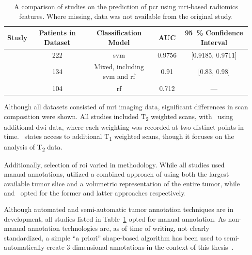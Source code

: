 \begin{table}[H]
    \centering
    \begin{tabular}{c c c c c}
        Study & Patients in Dataset & Classification Model & AUC & \SI{95}{\percent} Confidence Interval \\
        \hline
        \cite{radiomics_analysis_pcr_rectal} & \num{222} & \acs{svm} & \num{0.9756} & [\num{0.9185}, \num{0.9711}] \\
        \cite{rectal_radiomics_svm_rf} & \num{134} & Mixed, including \acs{svm} and \acs{rf} & \num{0.91} & [\num{0.83}, \num{0.98}] \\
        \cite{multisite_rectal_radiomics} & \num{104} & \acs{rf} & \num{0.712} & --- %
    \end{tabular}
    \caption{A comparison of studies on the prediction of \ac{pcr} using \ac{mri}-based radiomics features. Where missing, data was not available from the original study.}\label{tbl:other_studies_auc}
\end{table}

Although all datasets
consisted of \ac{mri} imaging data, significant differences in scan 
composition were shown. All studies included T\textsubscript{2} weighted scans, 
with~\cite{radiomics_analysis_pcr_rectal} using additional \ac{dwi} data, where each weighting was recorded at 
two distinct points in time.~\cite{rectal_radiomics_svm_rf} states access to
additional T\textsubscript{1} weighted scans, though it focuses on the analysis 
of T\textsubscript{2} data.

Additionally, selection of \ac{roi} varied in methodology. While all studies 
used manual annotations, \cite{multisite_rectal_radiomics} utilized a combined 
approach of using both the largest available tumor slice and a volumetric 
representation of the entire tumor, while~\cite{rectal_radiomics_svm_rf} 
and~\cite{multisite_rectal_radiomics} opted for the former and latter approaches
respectively.

Although automated and semi-automatic tumor annotation techniques are in 
development, all studies listed in Table~\ref{tbl:other_studies_auc} opted for 
manual annotation. As non-manual annotation technologies are, as of time of 
writing, not clearly standardized, a simple \enquote{a priori} shape-based 
algorithm has been used to semi-automatically create 3-dimensional 
annotations in the context of this thesis~\cite{auto_and_semiauto,semiautomatic_prostate,dl_rectal_segmentation}.

